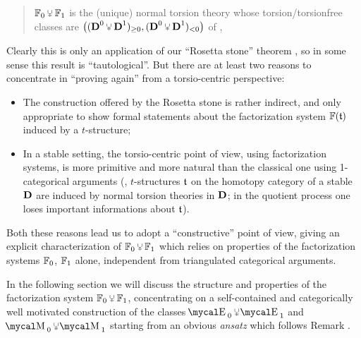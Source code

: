\begin{quote}
$\fF_0\glue \fF_1$ is the (unique) normal torsion theory whose torsion\fshyp{}torsionfree classes are $\big((\D^0\glue \D^1)_{\ge 0},(\D^0\glue \D^1)_{<0}\big)$ of ,
\end{quote}
Clearly this is only an application of our ``Rosetta stone'' theorem , so in some sense this result is ``tautological''. But there are at least two reasons to concentrate in ``proving again''  from a torsio\hyp{}centric perspective:
\begin{itemize}
\item The construction offered by the Rosetta stone is rather indirect, and only appropriate to show formal statements about the factorization system $\mathbb{F}(\mathfrak{t})$ induced by a $t$\hyp{}structure;
\item In a stable setting, the torsio\hyp{}centric point of view, using factorization systems, is more primitive and more natural than the classical one using 1-categorical arguments (\ie, $t$\hyp{}structures $\mathfrak{t}$ on the homotopy category of a stable $\textbf{D}$ are induced by normal torsion theories in $\textbf{D}$; in the quotient process one loses important informations about $\mathfrak{t}$).
\end{itemize}
Both these reasons lead us to adopt a ``constructive'' point of view, giving an explicit characterization of $\fF_0\glue \fF_1$ which relies on properties of the factorization systems $\mathbb{F}_0$, $\mathbb{F}_1$ alone, independent from triangulated categorical arguments. 

In the following section we will discuss the structure and properties of the factorization system $\fF_0\glue \fF_1$, concentrating on a self\hyp{}contained and categorically well motivated construction of the classes $\EE_0\glue\EE_1$ and $\MM_0\glue\MM_1$ starting from an obvious \emph{ansatz} which follows Remark .

